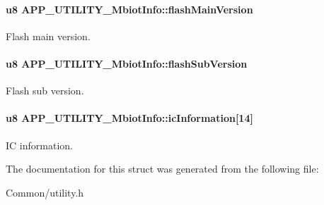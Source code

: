 \paragraph[{\texorpdfstring{flash\+Main\+Version}{flashMainVersion}}]{\setlength{\rightskip}{0pt plus 5cm}u8 A\+P\+P\+\_\+\+U\+T\+I\+L\+I\+T\+Y\+\_\+\+Mbiot\+Info\+::flash\+Main\+Version}\hypertarget{struct_a_p_p___u_t_i_l_i_t_y___mbiot_info_ac54c090da074dc58ca72d4b7af7bbbf0}{}\label{struct_a_p_p___u_t_i_l_i_t_y___mbiot_info_ac54c090da074dc58ca72d4b7af7bbbf0}
Flash main version. 
\paragraph[{\texorpdfstring{flash\+Sub\+Version}{flashSubVersion}}]{\setlength{\rightskip}{0pt plus 5cm}u8 A\+P\+P\+\_\+\+U\+T\+I\+L\+I\+T\+Y\+\_\+\+Mbiot\+Info\+::flash\+Sub\+Version}\hypertarget{struct_a_p_p___u_t_i_l_i_t_y___mbiot_info_ae86b82bb8ffa5de27543713707cca487}{}\label{struct_a_p_p___u_t_i_l_i_t_y___mbiot_info_ae86b82bb8ffa5de27543713707cca487}
Flash sub version. 
\paragraph[{\texorpdfstring{ic\+Information}{icInformation}}]{\setlength{\rightskip}{0pt plus 5cm}u8 A\+P\+P\+\_\+\+U\+T\+I\+L\+I\+T\+Y\+\_\+\+Mbiot\+Info\+::ic\+Information\mbox{[}14\mbox{]}}\hypertarget{struct_a_p_p___u_t_i_l_i_t_y___mbiot_info_ac445ad9693f701328bb4bf701d67df18}{}\label{struct_a_p_p___u_t_i_l_i_t_y___mbiot_info_ac445ad9693f701328bb4bf701d67df18}
IC information. 

The documentation for this struct was generated from the following file\+:\begin{DoxyCompactItemize}
\item 
Common/utility.\+h\end{DoxyCompactItemize}

